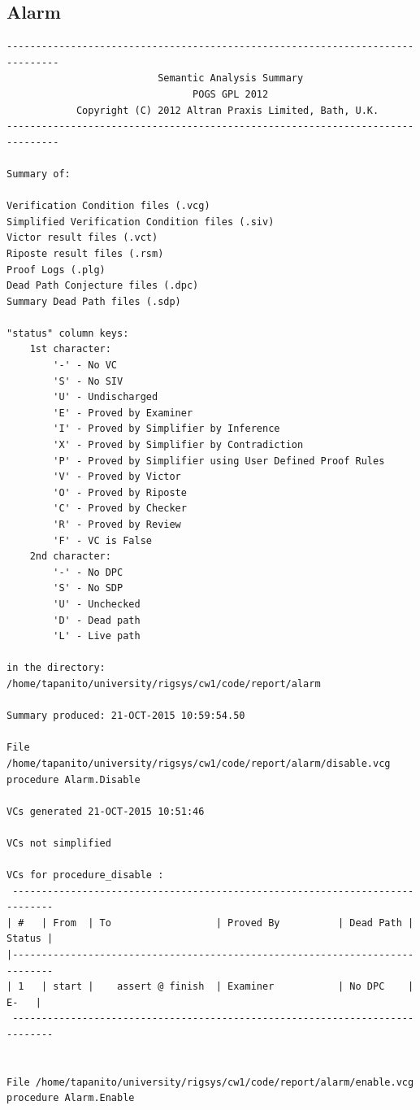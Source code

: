 \documentclass[a4paper, titlepage]{article}
\begin{document}
\subsection{Alarm}
{\small
\begin{lstlisting}
-------------------------------------------------------------------------------
                          Semantic Analysis Summary                            
                                POGS GPL 2012                                  
            Copyright (C) 2012 Altran Praxis Limited, Bath, U.K.               
-------------------------------------------------------------------------------

Summary of:

Verification Condition files (.vcg)
Simplified Verification Condition files (.siv)
Victor result files (.vct)
Riposte result files (.rsm)
Proof Logs (.plg)
Dead Path Conjecture files (.dpc)
Summary Dead Path files (.sdp)

"status" column keys:
    1st character:
        '-' - No VC
        'S' - No SIV
        'U' - Undischarged
        'E' - Proved by Examiner
        'I' - Proved by Simplifier by Inference
        'X' - Proved by Simplifier by Contradiction
        'P' - Proved by Simplifier using User Defined Proof Rules
        'V' - Proved by Victor
        'O' - Proved by Riposte
        'C' - Proved by Checker
        'R' - Proved by Review
        'F' - VC is False
    2nd character:
        '-' - No DPC
        'S' - No SDP
        'U' - Unchecked
        'D' - Dead path
        'L' - Live path

in the directory:
/home/tapanito/university/rigsys/cw1/code/report/alarm

Summary produced: 21-OCT-2015 10:59:54.50

File /home/tapanito/university/rigsys/cw1/code/report/alarm/disable.vcg
procedure Alarm.Disable

VCs generated 21-OCT-2015 10:51:46

VCs not simplified

VCs for procedure_disable :
 -----------------------------------------------------------------------------
| #   | From  | To                  | Proved By          | Dead Path | Status |
|-----------------------------------------------------------------------------
| 1   | start |    assert @ finish  | Examiner           | No DPC    |   E-   |
 -----------------------------------------------------------------------------


File /home/tapanito/university/rigsys/cw1/code/report/alarm/enable.vcg
procedure Alarm.Enable


\end{lstlisting}}
\end{document}
